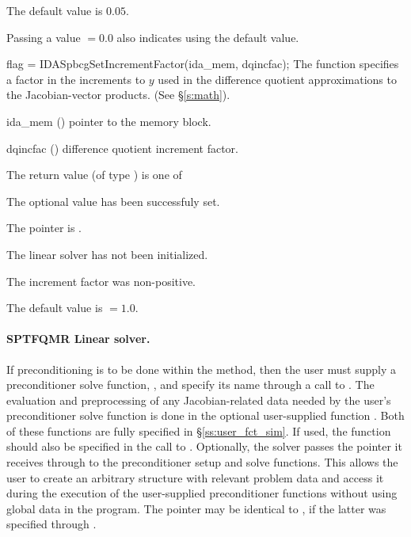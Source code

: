 {
  The default value is $0.05$.

  Passing a value $ = 0.0$ also indicates using the default value.
}
{
  flag = IDASpbcgSetIncrementFactor(ida\_mem, dqincfac);
}
{
  The function  specifies a factor in the 
  increments to $y$ used in the difference quotient approximations 
  to the Jacobian-vector products.  (See \S\ref{s:math}).
}
{
  \begin{args}[dqincfac]
  \item[ida\_mem] ()
    pointer to the {\ida} memory block.
  \item[dqincfac] ()
    difference quotient increment factor.
  \end{args}
}
{
  The return value  (of type ) is one of
  \begin{args}
  \item[\Id{IDASPBCG\_SUCCESS}] 
    The optional value has been successfuly set.
  \item[\Id{IDASPBCG\_MEM\_NULL}]
    The  pointer is .
  \item[\Id{IDASPBCG\_LMEM\_NULL}]
    The {\idaspgmr} linear solver has not been initialized.
  \item[\Id{IDASPBCG\_ILL\_INPUT}]
    The increment factor was non-positive.
  \end{args}
}
{
  The default value is  $=1.0$.
}
\noindent\paragraph{\bf SPTFQMR Linear solver.}
If preconditioning is to be done within the {\sptfqmr} method, then the user
must supply a preconditioner solve function, , and specify its
name through a call to .
The evaluation and preprocessing of any Jacobian-related data needed
by the user's preconditioner solve function is done in the optional
user-supplied function . Both of these functions are
fully specified in \S\ref{ss:user_fct_sim}.
If used, the  function should also be specified in the call to
.
Optionally, the {\idasptfqmr} solver passes the pointer it receives through 
 to the preconditioner setup and solve functions.  
This allows the user to create an arbitrary structure with relevant problem data 
and access it during the execution of the user-supplied preconditioner functions
without using global data in the program.  
The pointer  may be identical to , if the latter was 
specified through .

